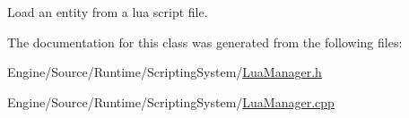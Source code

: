 Load an entity from a lua script file. 

The documentation for this class was generated from the following files\+:\begin{DoxyCompactItemize}
\item 
Engine/\+Source/\+Runtime/\+Scripting\+System/\mbox{\hyperlink{_lua_manager_8h}{Lua\+Manager.\+h}}\item 
Engine/\+Source/\+Runtime/\+Scripting\+System/\mbox{\hyperlink{_lua_manager_8cpp}{Lua\+Manager.\+cpp}}\end{DoxyCompactItemize}
